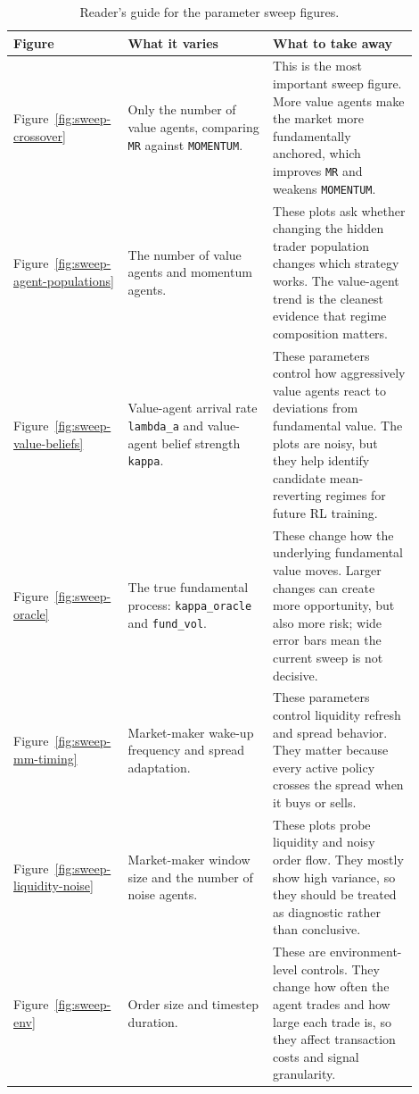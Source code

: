\documentclass[11pt]{article}
\begin{document}
\begin{table}[H]
\centering
\small
\begin{tabular}{p{0.22\linewidth}p{0.34\linewidth}p{0.34\linewidth}}
\toprule
Figure & What it varies & What to take away \\
\midrule
Figure~\ref{fig:sweep-crossover} &
Only the number of value agents, comparing \texttt{MR} against
\texttt{MOMENTUM}. &
This is the most important sweep figure. More value agents make the market more
fundamentally anchored, which improves \texttt{MR} and weakens
\texttt{MOMENTUM}. \\
Figure~\ref{fig:sweep-agent-populations} &
The number of value agents and momentum agents. &
These plots ask whether changing the hidden trader population changes which
strategy works. The value-agent trend is the cleanest evidence that regime
composition matters. \\
Figure~\ref{fig:sweep-value-beliefs} &
Value-agent arrival rate \texttt{lambda\_a} and value-agent belief strength
\texttt{kappa}. &
These parameters control how aggressively value agents react to deviations from
fundamental value. The plots are noisy, but they help identify candidate
mean-reverting regimes for future RL training. \\
Figure~\ref{fig:sweep-oracle} &
The true fundamental process: \texttt{kappa\_oracle} and \texttt{fund\_vol}. &
These change how the underlying fundamental value moves. Larger changes can
create more opportunity, but also more risk; wide error bars mean the current
sweep is not decisive. \\
Figure~\ref{fig:sweep-mm-timing} &
Market-maker wake-up frequency and spread adaptation. &
These parameters control liquidity refresh and spread behavior. They matter
because every active policy crosses the spread when it buys or sells. \\
Figure~\ref{fig:sweep-liquidity-noise} &
Market-maker window size and the number of noise agents. &
These plots probe liquidity and noisy order flow. They mostly show high
variance, so they should be treated as diagnostic rather than conclusive. \\
Figure~\ref{fig:sweep-env} &
Order size and timestep duration. &
These are environment-level controls. They change how often the agent trades
and how large each trade is, so they affect transaction costs and signal
granularity. \\
\bottomrule
\end{tabular}
\caption{Reader's guide for the parameter sweep figures.}
\label{tab:sweep-figure-guide}
\end{table}
\end{document}
